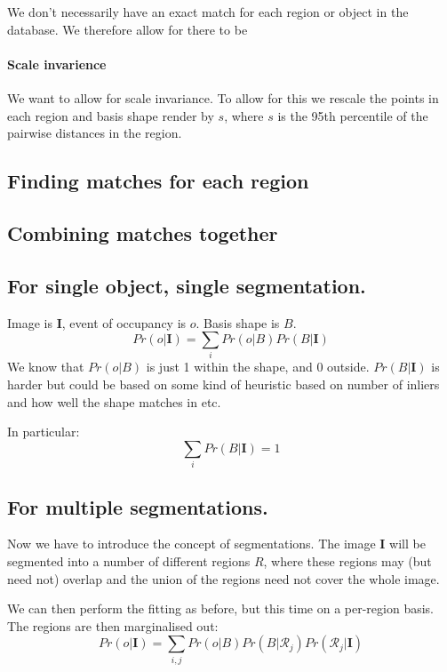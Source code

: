 \documentclass[10pt,a4paper]{article}
\newcommand{\prob}{Pr}
\newcommand{\rgbdimage}{\mathbf{I}}
\newcommand{\imregion}{\mathcal{R}}
\newcommand{\occ}{o}
\newcommand{\basisshape}{B}
\begin{document}
We don't necessarily have an exact match for each region or object in the database. We therefore allow for there to be 

\paragraph{Scale invarience}
We want to allow for scale invariance. To allow for this we rescale the points in each region and basis shape render by $s$, where $s$ is the 95th percentile of the pairwise distances in the region.

\subsection{Finding matches for each region}


\subsection{Combining matches together}



\subsection{For single object, single segmentation.}

Image is $\rgbdimage$, event of occupancy is $o$. Basis shape is $\basisshape$.
$$
\prob(\occ | \rgbdimage) = \sum_i \prob(\occ | \basisshape) \prob(\basisshape | \rgbdimage)
$$ 
We know that $\prob(\occ|\basisshape)$ is just 1 within the shape, and 0 outside. 
$\prob(\basisshape|\rgbdimage)$ is harder but could be based on some kind of heuristic based on number of inliers and how well the shape matches in etc.

In particular:
$$ 
\sum_i \prob(\basisshape|\rgbdimage) = 1
$$

\subsection{For multiple segmentations.}

Now we have to introduce the concept of segmentations. 
The image $\rgbdimage$ will be segmented into a number of different regions $R$, where these regions may (but need not) overlap and the union of the regions need not cover the whole image.

We can then perform the fitting as before, but this time on a per-region basis. The regions are then marginalised out:
$$
\prob(\occ | \rgbdimage) = \sum_{i,j} \prob(\occ|\basisshape)\prob(\basisshape|\imregion_j)\prob(\imregion_j|\rgbdimage)
$$
\end{document}
